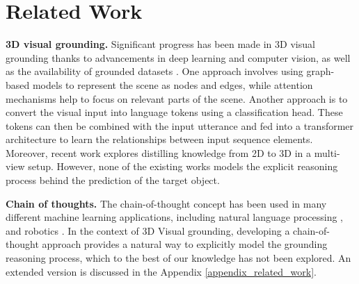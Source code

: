 \section{Related Work}
\label{sec_Related_Work}

\noindent \textbf{3D visual grounding.}
Significant progress has been made in 3D visual grounding thanks to advancements in deep learning and computer vision, as well as the availability of grounded datasets \citep{achlioptas2020referit3d, chen2020scanrefer, abdelreheem2022scanents3d, yuan2022toward}. 
One approach involves using graph-based models \citep{achlioptas2020referit3d, feng2021free, yuan2021instancerefer, huang2021text} to represent the scene as nodes and edges, while attention mechanisms help to focus on relevant parts of the scene.
Another approach \citep{roh2022languagerefer} is to convert the visual input into language tokens using a classification head. These tokens can then be combined with the input utterance and fed into a transformer architecture to learn the relationships between input sequence elements.
Moreover, recent work \citep{bakr2022look, yang2021sat} explores distilling knowledge from 2D to 3D in a multi-view setup. 
However, none of the existing works models the explicit reasoning process behind the prediction of the target object.

\noindent \textbf{Chain of thoughts.}
The chain-of-thought concept has been used in many different machine learning applications, including natural language processing \citep{wei2022chain, chowdhery2022palm, lyu2023faithful, wang2022self, zhang2023multimodal, madaan2022text}, and robotics \citep{jia2023chain, yang2022chain}. 
In the context of 3D Visual grounding, developing a chain-of-thought approach provides a natural way to explicitly model the grounding reasoning process, which to the best of our knowledge has not been explored.
An extended version is discussed in the Appendix \ref{appendix_related_work}.
